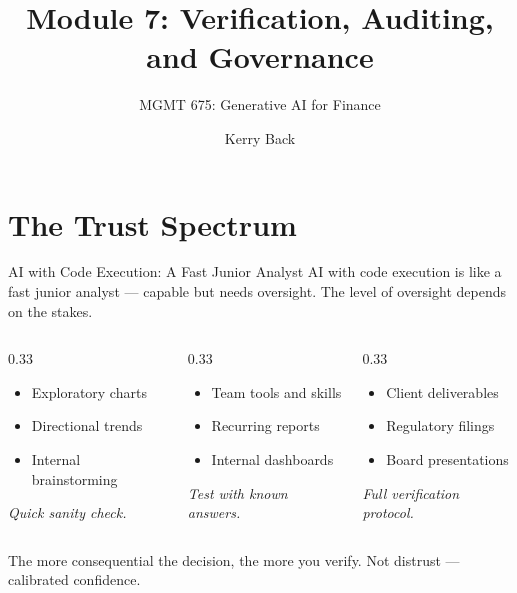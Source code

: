 \documentclass[aspectratio=169]{beamer}
\subtitle{MGMT 675: Generative AI for Finance}
\title{Module 7: Verification, Auditing, and Governance}
\author{Kerry Back}
\date{}
\begin{document}
\maketitle

\section{The Trust Spectrum}

\begin{frame}[shrink=5]{AI with Code Execution: A Fast Junior Analyst}
AI with code execution is like a \alert{fast junior analyst} --- capable but needs oversight. The level of oversight depends on the stakes.
\vspace{0.3cm}
\begin{columns}[T]
\begin{column}{0.33\textwidth}
\begin{shadedbox}[title=\textbf{Low-Stakes}]
\begin{itemize}\small
  \item Exploratory charts
  \item Directional trends
  \item Internal brainstorming
\end{itemize}
\vspace{0.2cm}
\centering\small\textit{Quick sanity check.}
\end{shadedbox}
\end{column}
\begin{column}{0.33\textwidth}
\begin{shadedbox}[title=\textbf{Medium-Stakes}]
\begin{itemize}\small
  \item Team tools and skills
  \item Recurring reports
  \item Internal dashboards
\end{itemize}
\vspace{0.2cm}
\centering\small\textit{Test with known answers.}
\end{shadedbox}
\end{column}
\begin{column}{0.33\textwidth}
\begin{shadedbox}[title=\textbf{High-Stakes}]
\begin{itemize}\small
  \item Client deliverables
  \item Regulatory filings
  \item Board presentations
\end{itemize}
\vspace{0.2cm}
\centering\small\textit{Full verification protocol.}
\end{shadedbox}
\end{column}
\end{columns}
\vspace{0.3cm}
The more consequential the decision, the more you verify. \alert{Not distrust --- calibrated confidence.}
\end{frame}
\end{document}
